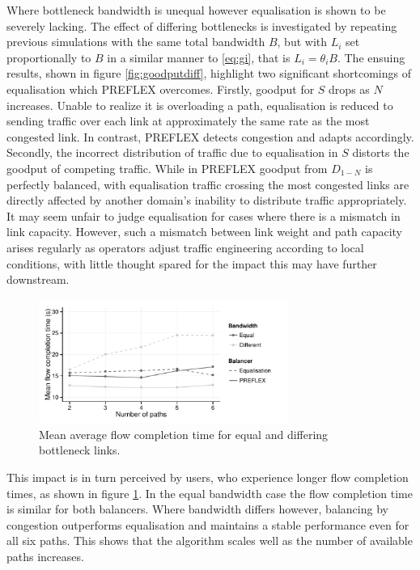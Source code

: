Where bottleneck bandwidth is unequal however equalisation is shown to be severely lacking.
The effect of differing bottlenecks is investigated by repeating previous simulations with the same total bandwidth $B$, but with $L_i$ set proportionally to $B$ in a similar manner to \eqref{eq:gi}, that is $L_i = \theta_i B$.
The ensuing results, shown in figure \ref{fig:goodputdiff}, highlight two significant shortcomings of equalisation which \ac{PREFLEX} overcomes. 
Firstly, goodput for $S$ drops as $N$ increases. 
Unable to realize it is overloading a path, equalisation is reduced to sending traffic over each link at approximately the same rate as the most congested link. 
In contrast, \ac{PREFLEX} detects congestion and adapts accordingly. 
Secondly, the incorrect distribution of traffic due to equalisation in $S$ distorts the goodput of competing traffic. 
While in \ac{PREFLEX} goodput from $D_{1-N}$ is perfectly balanced, with equalisation traffic crossing the most congested links are directly affected by another domain's inability to distribute traffic appropriately.
It may seem unfair to judge equalisation for cases where there is a mismatch in link capacity.
However, such a mismatch between link weight and path capacity arises regularly as operators adjust traffic engineering according to local conditions, with little thought spared for the impact this may have further downstream.

\begin{figure}
    \centering
    \includegraphics[width=3.2in]{figures/cate/duration}
    \caption{Mean average flow completion time for equal and differing bottleneck links.}
    \label{fig:duration}
\end{figure}

This impact is in turn perceived by users, who experience longer flow completion times, as shown in figure \ref{fig:duration}. 
In the equal bandwidth case the flow completion time is similar for both balancers.  
Where bandwidth differs however, balancing by congestion outperforms equalisation and maintains a stable performance even for all six paths.  
This shows that the algorithm scales well as the number of available paths increases. 
